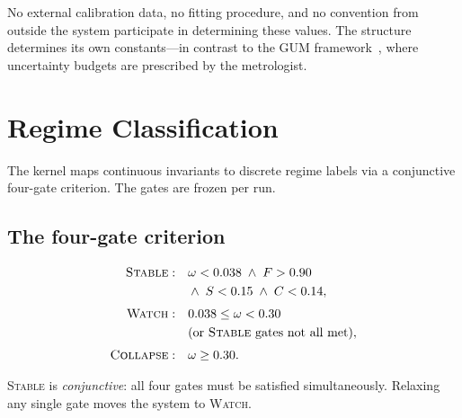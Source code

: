 \documentclass[
  aps,
  prd,
  twocolumn,
  superscriptaddress,
  nofootinbib,
  floatfix
]{revtex4-2}
\newcommand{\beq}{\begin{equation}}
\newcommand{\eeq}{\end{equation}}
\newcommand{\regime}[1]{\textrm{\upshape\scshape#1}}
\begin{document}
No external calibration data, no fitting procedure, and no
convention from outside the system participate in determining
these values.  The structure determines its own constants---in
contrast to the GUM framework~\cite{jcgm2008gum}, where
uncertainty budgets are prescribed by the metrologist.


\section{Regime Classification}\label{sec:regime}

The kernel maps continuous invariants to discrete regime labels via
a conjunctive four-gate criterion.  The gates are frozen per run.

\subsection{The four-gate criterion}

\beq
\begin{aligned}
  \regime{Stable}: \quad &
    \omega < 0.038 \;\wedge\; F > 0.90 \\
    & \wedge\; S < 0.15 \;\wedge\; C < 0.14, \\[0.3em]
  \regime{Watch}: \quad &
    0.038 \leq \omega < 0.30 \\
    & \text{(or \regime{Stable} gates not all met)}, \\[0.3em]
  \regime{Collapse}: \quad &
    \omega \geq 0.30.
\end{aligned}
\eeq

\regime{Stable} is \emph{conjunctive}: all four gates must be
satisfied simultaneously.  Relaxing any single gate moves the
system to \regime{Watch}.
\end{document}
